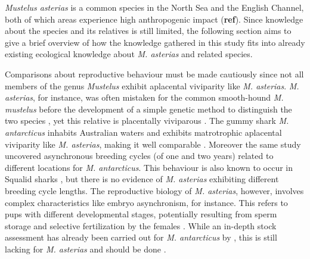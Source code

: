 \documentclass[
  authoryear,
  review,
  3p]{elsarticle}
\begin{document}
\emph{Mustelus asterias} is a common species in the North Sea and the
English Channel, both of which areas experience high anthropogenic
impact (\textbf{ref}). Since knowledge about the species and its
relatives is still limited, the following section aims to give a brief
overview of how the knowledge gathered in this study fits into already
existing ecological knowledge about \emph{M. asterias} and related
species.

Comparisons about reproductive behaviour must be made cautiously since
not all members of the genus \emph{Mustelus} exhibit aplacental
viviparity like \emph{M. asterias}. \emph{M. asterias}, for instance,
was often mistaken for the common smooth-hound \emph{M. mustelus} before
the development of a simple genetic method to distinguish the two
species \citep{farrell_2009}, yet this relative is placentally
viviparous \citep{dasilva_2018}. The gummy shark \emph{M. antarcticus}
inhabits Australian waters and exhibits matrotrophic aplacental
viviparity like \emph{M. asterias}, making it well comparable
\citep{walker_2007}. Moreover the same study uncovered asynchronous
breeding cycles (of one and two years) related to different locations
for \emph{M. antarcticus}. This behaviour is also known to occur in
Squalid sharks \citep{braccini_2006}, but there is no evidence of
\emph{M. asterias} exhibiting different breeding cycle lengths. The
reproductive biology of \emph{M. asterias}, however, involves complex
characteristics like embryo asynchronism, for instance. This refers to
pups with different developmental stages, potentially resulting from
sperm storage and selective fertilization by the females
\citep{farrell_2010a}. While an in-depth stock assessment has already
been carried out for \emph{M. antarcticus} by \citet{pribac_2005}, this
is still lacking for \emph{M. asterias} and should be done
\citep{mccullyphillips_2015}.
\end{document}
